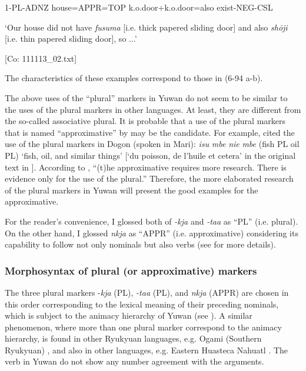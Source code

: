       1-PL-ADNZ  house=APPR=TOP  k.o.door+k.o.door=also  exist-NEG-CSL

      ‘Our house did not have \textit{fusuma} [i.e. thick papered sliding door] and also \textit{shōji} [i.e. thin papered sliding door], so ...’

      [Co: 111113\_02.txt]

The characteristics of these examples correspond to those in (6-94 a-b).

  The above uses of the “plural” markers in Yuwan do not seem to be similar to the uses of the plural markers in other languages. At least, they are different from the so-called associative plural. It is probable that a use of the plural markers that is named “approximative” by \citet[239-240]{Corbett2000} may be the candidate. For example, \citet[239]{Corbett2000} cited the use of the plural markers in Dogon (spoken in Mari): \textit{isu} \textit{mbe} \textit{nie} \textit{mbe} (fish PL oil PL) ‘fish, oil, and similar things’ [‘du poisson, de l’huile et cetera’ in the original text in \citet[11]{Plungian1995}]. According to \citet[240]{Corbett2000}, “(t)he approximative requires more research. There is evidence only for the use of the plural.” Therefore, the more elaborated research of the plural markers in Yuwan will present the good examples for the approximative.

  For the reader’s convenience, I glossed both of \textit{{}-kja} and \textit{{}-taa} as “PL” (i.e. plural). On the other hand, I glossed \textit{nkja} as “APPR” (i.e. approximative) considering its capability to follow not only nominals but also verbs (see  for more details).

\subsubsection{Morphosyntax of plural (or approximative) markers}

The three plural markers -\textit{kja} (PL), \textit{{}-taa} (PL), and \textit{nkja} (APPR) are chosen in this order corresponding to the lexical meaning of their preceding nominals, which is subject to the animacy hierarchy of Yuwan (see ). A similar phenomenon, where more than one plural marker correspond to the animacy hierarchy, is found in other Ryukyuan languages, e.g. Ogami (Southern Ryukyuan) \citep[133]{Pellard2010}, and also in other languages, e.g. Eastern Huasteca Nahuatl \citep[77-78]{Corbett2000}. The verb in Yuwan do not show any number agreement with the arguments.

